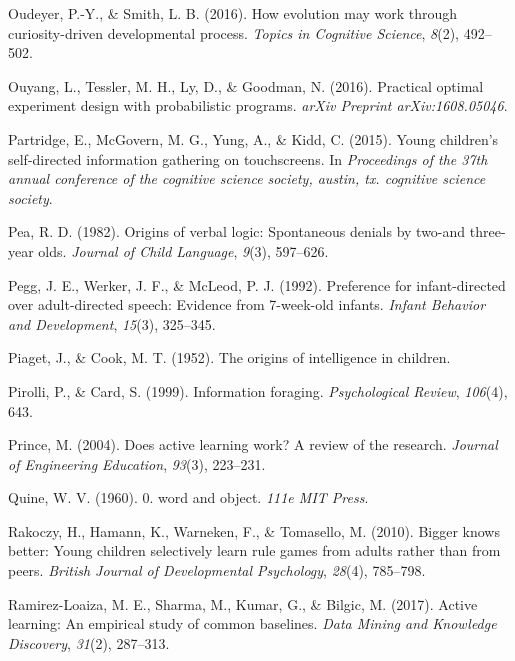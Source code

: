 \documentclass[oneside]{report}
\begin{document}
\hypertarget{ref-oudeyer2016evolution}{}
Oudeyer, P.-Y., \& Smith, L. B. (2016). How evolution may work through
curiosity-driven developmental process. \emph{Topics in Cognitive
Science}, \emph{8}(2), 492--502.

\hypertarget{ref-ouyang2016practical}{}
Ouyang, L., Tessler, M. H., Ly, D., \& Goodman, N. (2016). Practical
optimal experiment design with probabilistic programs. \emph{arXiv
Preprint arXiv:1608.05046}.

\hypertarget{ref-partridge2015young}{}
Partridge, E., McGovern, M. G., Yung, A., \& Kidd, C. (2015). Young
children's self-directed information gathering on touchscreens. In
\emph{Proceedings of the 37th annual conference of the cognitive science
society, austin, tx. cognitive science society}.

\hypertarget{ref-pea1982origins}{}
Pea, R. D. (1982). Origins of verbal logic: Spontaneous denials by
two-and three-year olds. \emph{Journal of Child Language}, \emph{9}(3),
597--626.

\hypertarget{ref-pegg1992preference}{}
Pegg, J. E., Werker, J. F., \& McLeod, P. J. (1992). Preference for
infant-directed over adult-directed speech: Evidence from 7-week-old
infants. \emph{Infant Behavior and Development}, \emph{15}(3), 325--345.

\hypertarget{ref-piaget1952origins}{}
Piaget, J., \& Cook, M. T. (1952). The origins of intelligence in
children.

\hypertarget{ref-pirolli1999information}{}
Pirolli, P., \& Card, S. (1999). Information foraging.
\emph{Psychological Review}, \emph{106}(4), 643.

\hypertarget{ref-prince2004does}{}
Prince, M. (2004). Does active learning work? A review of the research.
\emph{Journal of Engineering Education}, \emph{93}(3), 223--231.

\hypertarget{ref-quine19600}{}
Quine, W. V. (1960). 0. word and object. \emph{111e MIT Press}.

\hypertarget{ref-rakoczy2010bigger}{}
Rakoczy, H., Hamann, K., Warneken, F., \& Tomasello, M. (2010). Bigger
knows better: Young children selectively learn rule games from adults
rather than from peers. \emph{British Journal of Developmental
Psychology}, \emph{28}(4), 785--798.

\hypertarget{ref-ramirez2017active}{}
Ramirez-Loaiza, M. E., Sharma, M., Kumar, G., \& Bilgic, M. (2017).
Active learning: An empirical study of common baselines. \emph{Data
Mining and Knowledge Discovery}, \emph{31}(2), 287--313.
\end{document}

